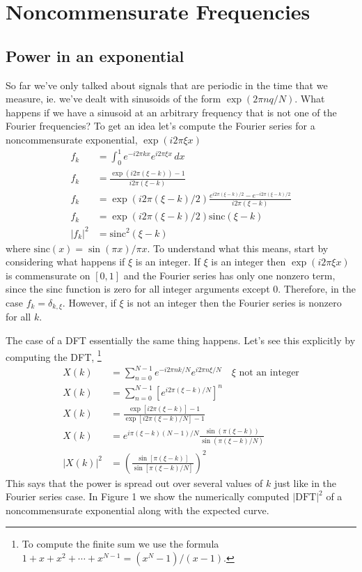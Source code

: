 \documentclass[twocolumn]{article}
\begin{document}
\section{Noncommensurate Frequencies}


\subsection{Power in an exponential}

So far we've only talked about signals that are periodic in the time that we measure, ie. we've dealt with sinusoids of the form $\exp\left(2\pi nq/N\right)$. What happens if we have a sinusoid at an arbitrary frequency that is not one of the Fourier frequencies? To get an idea let's compute the Fourier series for a noncommensurate exponential, $\exp\left(i2\pi\xi x\right)$
\begin{align*}
f_{k} & = \int_{0}^{1}e^{-i2\pi kx}e^{i2\pi\xi x}\, dx\\
f_{k} & = \frac{\exp\left(i2\pi(\xi-k)\right)-1}{i2\pi(\xi-k)}\\
f_{k} & = \exp\left(i2\pi(\xi-k)/2\right)\frac{e^{i2\pi(\xi-k)/2}-e^{-i2\pi(\xi-k)/2}}{i2\pi(\xi-k)}\\
f_{k} & = \exp\left(i2\pi(\xi-k)/2\right)\textrm{sinc}\left(\xi-k\right)\\
|f_{k}|^{2} & = \textrm{sinc}^{2}\left(\xi-k\right)
\end{align*}
where $\textrm{sinc}(x)=\sin\left(\pi x\right)/\pi x$. To understand what this means, start by considering what happens if $\xi$ is an integer. If $\xi$ is an integer then $\exp\left(i2\pi\xi x\right)$ is commensurate on $[0,1]$ and the Fourier series has only one nonzero term, since the sinc function is zero for all integer arguments except 0. Therefore, in the case $f_{k}=\delta_{k,\xi}$. However, if $\xi$ is not an integer then the Fourier series is nonzero for all $k$.

The case of a DFT essentially the same thing happens. Let's see this explicitly by computing the DFT, \footnote{To compute the finite sum we use the formula $1+x+x^{2}+\cdots+x^{N-1}=(x^{N}-1)/(x-1)$.}
\begin{align*}
X(k) & = \sum_{n=0}^{N-1}e^{-i2\pi nk/N}e^{i2\pi n\xi/N}\quad\xi\textrm{ not an integer}\\
X(k) & = \sum_{n=0}^{N-1}\left[e^{i2\pi(\xi-k)/N}\right]^{n}\\
X(k) & = \frac{\exp\left[i2\pi\left(\xi-k\right)\right]-1}{\exp\left[i2\pi\left(\xi-k\right)/N\right]-1}\\
X(k) & = e^{i\pi(\xi-k)(N-1)/N}\frac{\sin\left(\pi\left(\xi-k\right)\right)}{\sin\left(\pi\left(\xi-k\right)/N\right)}\\
|X(k)|^{2} & = \left(\frac{\sin\left[\pi\left(\xi-k\right)\right]}{\sin\left[\pi\left(\xi-k\right)/N\right]}\right)^{2}
\end{align*}
This says that the power is spread out over several values of $k$ just like in the Fourier series case. In Figure 1 we show the numerically computed $|\textrm{DFT}|^2$ of a noncommensurate exponential along with the expected curve.
\end{document}
